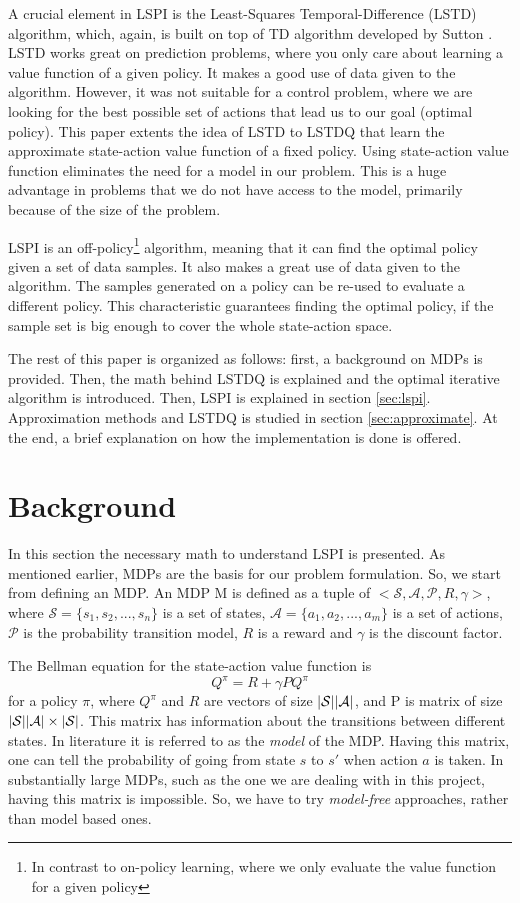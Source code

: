 \documentclass{article}
\theoremstyle{remark}
\DeclarePairedDelimiter\abs{\lvert}{\rvert}%
\begin{document}
A crucial element in LSPI is the Least-Squares Temporal-Difference (LSTD) algorithm, which, again, is built on top of TD algorithm developed by Sutton \cite{Sutton1988}. LSTD works great on prediction problems, where you only care about learning a value function of a given policy. It makes a good use of data given to the algorithm. However, it was not suitable for a control problem, where we are looking for the best possible set of actions that lead us to our goal (optimal policy). This paper extents the idea of LSTD to LSTDQ that learn the approximate state-action value function of a fixed policy. Using state-action value function eliminates the need for a model in our problem. This is a huge advantage in problems that we do not have access to the model, primarily because of the size of the problem.


LSPI is an off-policy\footnote{In contrast to on-policy learning, where we only evaluate the value function for a given policy} algorithm, meaning that it can find the optimal policy given a set of data samples. It also makes a great use of data given to the algorithm. The samples generated on a policy can be re-used to evaluate a different policy. This characteristic guarantees finding the optimal policy, if the sample set is big enough to cover the whole state-action space.

The rest of this paper is organized as follows: first, a background on MDPs is provided. Then, the math behind LSTDQ is explained and the optimal iterative algorithm is introduced. Then, LSPI is explained in section \ref{sec:lspi}. Approximation methods and LSTDQ is studied in section \ref{sec:approximate}. At the end, a brief explanation on how the implementation is done is offered.


\section{Background} \label{sec:background}
In this section the necessary math to understand LSPI is presented. As mentioned earlier, MDPs are the basis for our problem formulation. So, we start from defining an MDP. An MDP M is defined as a tuple of $<\mathcal{S, A, P}, R, \gamma>$, where $\mathcal{S} = \{s_1, s_2, ..., s_n\}$ is a set of states, $\mathcal{A} = \{a_1, a_2, ..., a_m\}$ is a set of actions, $\mathcal{P}$ is the probability transition model, $R$ is a reward and $\gamma$ is the discount factor.

The Bellman equation for the state-action value function is
\[ Q^\pi = R + \gamma P Q^\pi
\]
for a policy $\pi$, where $Q^\pi$ and $R$ are vectors of size $\mathcal{\abs{S} \abs{A}}$, and P is matrix of size $\mathcal{\abs{S} \abs{A}} \times \mathcal{\abs{S}}$. This matrix has information about the transitions between different states. In literature it is referred to as the \textit{model} of the MDP. Having this matrix, one can tell the probability of going from state $s$ to $s'$ when action $a$ is taken. In substantially large MDPs, such as the one we are dealing with in this project, having this matrix is impossible. So, we have to try \textit{model-free} approaches, rather than model based ones.
\end{document}
